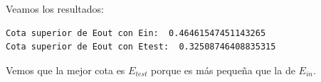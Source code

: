 \documentclass[size=a4, parskip=half, titlepage=false, toc=flat, toc=bib, 12pt]{scrartcl}
\begin{document}
\begin{enumerate}
\begin{enumerate}
Veamos los resultados:
\begin{verbatim}
Cota superior de Eout con Ein:  0.46461547451143265
Cota superior de Eout con Etest:  0.32508746408835315
\end{verbatim}
Vemos que la mejor cota es $E_{test}$ porque es más pequeña que la de $E_{in}$.
\end{enumerate}
\end{enumerate}

\end{document}
